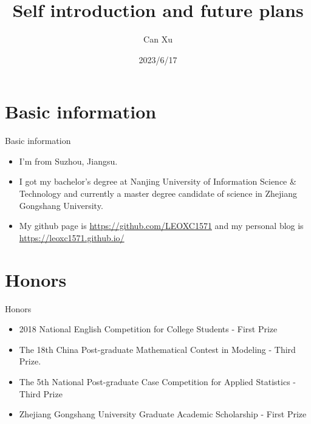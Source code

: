 \documentclass{beamer}
\author{Can Xu}
\title{Self introduction and future plans}
\subtitle{}
\institute{}
\date{2023/6/17}
\begin{document}
\kaishu
\begin{frame}
    \titlepage
    \centering{}
\end{frame}

\begin{frame}
    \tableofcontents[sectionstyle=show,subsectionstyle=show/shaded/hide,subsubsectionstyle=show/shaded/hide]
\end{frame}

\section{Basic information}
\begin{frame}{Basic information}
    \begin{itemize}
        \item I'm from Suzhou, Jiangsu.
        \item I got my bachelor's degree at Nanjing University of Information Science \& Technology and currently a master degree candidate of science in Zhejiang Gongshang University.
        \item My github page is \url{https://github.com/LEOXC1571} and my personal blog is \url{https://leoxc1571.github.io/}
    \end{itemize}
\end{frame}

\section{Honors}
\begin{frame}{Honors}
    \begin{itemize}
        \item 2018 National English Competition for College Students - First Prize
        \item The 18th China Post-graduate Mathematical Contest in Modeling - Third Prize.
        \item The 5th National Post-graduate Case Competition for Applied Statistics - Third Prize
        \item Zhejiang Gongshang University Graduate Academic Scholarship - First Prize
    \end{itemize}
\end{frame}
\end{document}

